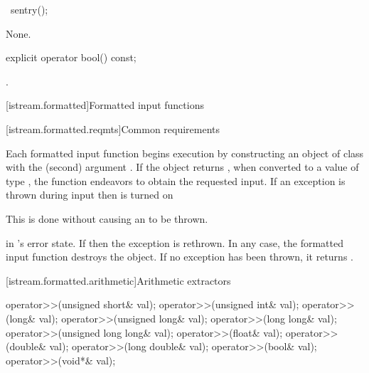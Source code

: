%
%
\begin{itemdecl}
~sentry();
\end{itemdecl}

\begin{itemdescr}
\pnum
\effects
None.
\end{itemdescr}

%
\begin{itemdecl}
explicit operator bool() const;
\end{itemdecl}

\begin{itemdescr}
\pnum
\returns
{}.
\end{itemdescr}

[istream.formatted]{Formatted input functions}

[istream.formatted.reqmts]{Common requirements}

\pnum
Each formatted input function begins execution by constructing an object of class
with the
(second) argument
.
If the
object returns
,
when converted to a value of type
,
the function endeavors
to obtain the requested input.
If an exception is thrown during input then
is turned on
\begin{footnote}
This is done without causing an
to be thrown.
\end{footnote}
in
's
error state.
If
then the exception is rethrown.
In any case, the formatted input function destroys the
object.
If no exception has been thrown, it returns
.

[istream.formatted.arithmetic]{Arithmetic extractors}

%
\begin{itemdecl}
operator>>(unsigned short& val);
operator>>(unsigned int& val);
operator>>(long& val);
operator>>(unsigned long& val);
operator>>(long long& val);
operator>>(unsigned long long& val);
operator>>(float& val);
operator>>(double& val);
operator>>(long double& val);
operator>>(bool& val);
operator>>(void*& val);
\end{itemdecl}

